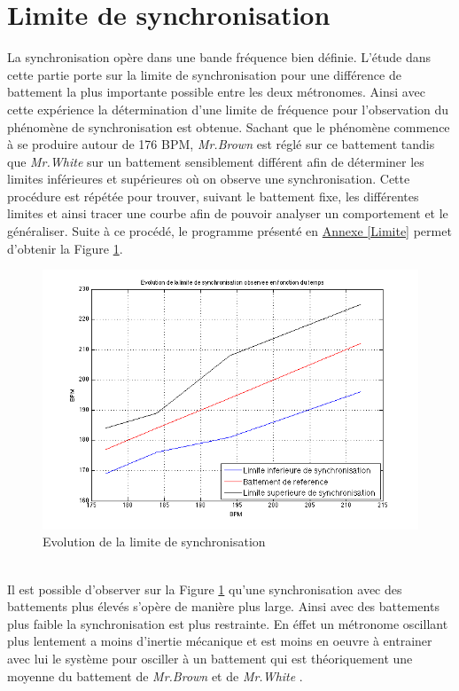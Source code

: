 \documentclass[a4paper,11pt]{report}
\begin{document}
\section{Limite de synchronisation}
La synchronisation opère dans une bande fréquence bien définie. L'étude dans cette partie porte sur la limite de synchronisation pour une différence de battement la plus importante possible entre les deux métronomes. Ainsi avec cette expérience la détermination d'une limite de fréquence pour l'observation du phénomène de synchronisation est obtenue. Sachant que le phénomène commence à se produire autour de 176 BPM, {\it Mr.Brown} est réglé sur ce battement tandis que {\it Mr.White} sur un battement sensiblement différent afin de déterminer les limites inférieures et supérieures où on observe une synchronisation. Cette procédure est répétée pour trouver, suivant le battement fixe, les différentes limites et ainsi tracer une courbe afin de pouvoir analyser un comportement et le généraliser. Suite à ce procédé, le programme présenté en \underline{Annexe \ref{Limite}} permet d'obtenir la Figure \ref{LimiteF}.
\begin{figure}[h]
\centering
\includegraphics[width=1\textwidth]{CourbeLimiteSynchro}
\caption{Evolution de la limite de synchronisation}\label{LimiteF}
\end{figure}\\
Il est possible d'observer sur la Figure \ref{LimiteF} qu'une synchronisation avec des battements plus élevés s'opère de manière plus large. Ainsi avec des battements plus faible la synchronisation est plus restrainte. En éffet un métronome oscillant plus lentement a moins d'inertie mécanique et est moins en oeuvre à entrainer avec lui le système pour osciller à un battement qui est théoriquement une moyenne du battement de {\it Mr.Brown} et de {\it Mr.White} \cite{piko}.
\end{document}
